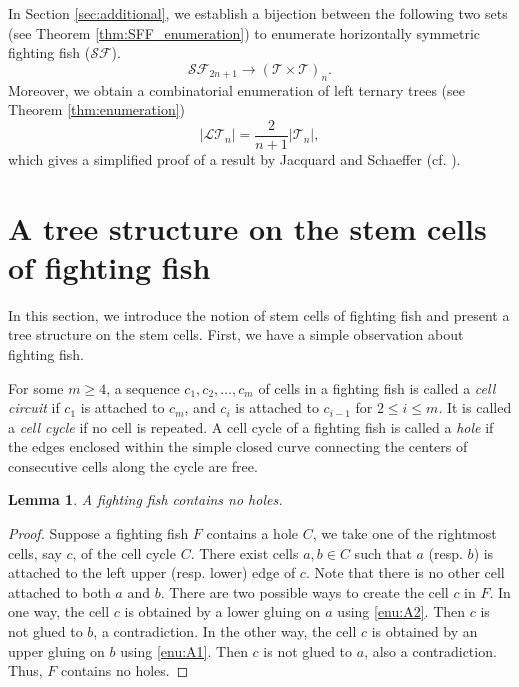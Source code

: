 \documentclass[a4paper,11pt,reqno]{amsart}
\newtheorem{lem}{Lemma}[section]
\theoremstyle{definition}
\numberwithin{equation}{section}
\newcommand{\LT}{{\mathcal{LT}}}
\newcommand{\SF}{{\mathcal{SF}}}
\newcommand{\T}{{\mathcal{T}}}
\begin{document}
In Section \ref{sec:additional}, we establish a bijection between the following two sets (see Theorem \ref{thm:SFF_enumeration}) to enumerate horizontally symmetric fighting fish ($\SF$).
\begin{equation}
\SF_{2n+1} \rightarrow (\T\times\T)_n.
\end{equation}
Moreover, we obtain a combinatorial enumeration of left ternary trees (see Theorem \ref{thm:enumeration})
\begin{equation}
|\LT_n| = \frac{2}{n+1}|\T_n|,
\end{equation}
which gives a simplified proof of a result by Jacquard and Schaeffer (cf. \cite[Theorem 2]{JS-1998}).

\section{A tree structure on the stem cells of fighting fish} \label{sec:tree-structure}

In this section, we introduce the notion of stem cells of  fighting fish and present a tree structure on the stem cells. First, we have a simple observation about fighting fish.

For some $m\ge 4$, a sequence $c_1,c_2,\dots,c_m$ of cells in a fighting fish is called a \emph{cell circuit} if $c_1$ is attached to $c_m$, and $c_i$ is attached to $c_{i-1}$ for $2\le i\le m$. It is called a \emph{cell cycle} if no cell is repeated.
A cell cycle of a fighting fish is called a \emph{hole} if the edges enclosed within the simple closed curve connecting the centers of consecutive cells along the cycle are free. 

\begin{lem} \label{lem:hole-free}
A fighting fish contains no holes.
\end{lem}

\begin{proof} Suppose a fighting fish $F$ contains a hole $C$, we take one of the rightmost cells, say $c$, of the cell cycle $C$. There exist cells $a,b\in C$ such that $a$ (resp. $b$) is attached to the left upper (resp. lower) edge of $c$. Note that there is no other cell attached to both $a$ and $b$. There are two possible ways to create the cell $c$ in $F$. In one way, the cell $c$ is obtained by a lower gluing on $a$ using \ref{enu:A2}. Then $c$ is not glued to $b$, a contradiction. In the other way, the cell $c$ is obtained by an upper gluing on $b$ using \ref{enu:A1}. Then $c$ is not glued to $a$, also a contradiction.
Thus, $F$ contains no holes.
\end{proof}
\end{document}
